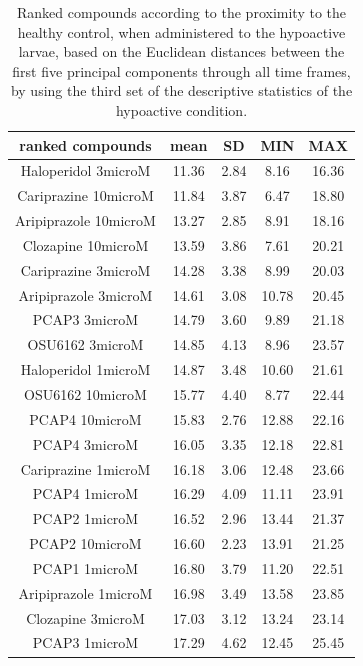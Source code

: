 \documentclass[a4paper,12pt]{article}
\begin{document}
\begin{table}[h!]\tiny
\centering
\caption{Ranked compounds according to the proximity to the healthy control, when administered to the hypoactive larvae, based on the Euclidean distances between the first five principal components through all time frames, by using the third set of the descriptive statistics of the hypoactive condition.}
\begin{tabular}{|c|c|c|c|c|}
\hline
ranked compounds             & mean & SD   & MIN  & MAX   \\ \hline
Haloperidol 3microM   & 11.36 & 2.84  & 8.16  & 16.36 \\ \hline
Cariprazine 10microM  & 11.84 & 3.87  & 6.47  & 18.80  \\ \hline
Aripiprazole 10microM & 13.27 & 2.85  & 8.91  & 18.16 \\ \hline
Clozapine 10microM    & 13.59 & 3.86  & 7.61  & 20.21 \\ \hline
Cariprazine 3microM   & 14.28 & 3.38  & 8.99  & 20.03 \\ \hline
Aripiprazole 3microM  & 14.61 & 3.08  & 10.78 & 20.45 \\ \hline
PCAP3 3microM       & 14.79 & 3.60   & 9.89  & 21.18 \\ \hline
OSU6162 3microM       & 14.85 & 4.13  & 8.96  & 23.57 \\ \hline
Haloperidol 1microM   & 14.87 & 3.48  & 10.60  & 21.61 \\ \hline
OSU6162 10microM      & 15.77 & 4.40   & 8.77  & 22.44 \\ \hline
PCAP4 10microM      & 15.83 & 2.76  & 12.88 & 22.16 \\ \hline
PCAP4 3microM       & 16.05 & 3.35  & 12.18 & 22.81 \\ \hline
Cariprazine 1microM   & 16.18 & 3.06  & 12.48 & 23.66 \\ \hline
PCAP4 1microM       & 16.29 & 4.09  & 11.11 & 23.91 \\ \hline
PCAP2 1microM         & 16.52 & 2.96  & 13.44 & 21.37 \\ \hline
PCAP2 10microM        & 16.60  & 2.23  & 13.91 & 21.25 \\ \hline
PCAP1 1microM         & 16.80  & 3.79  & 11.20  & 22.51 \\ \hline
Aripiprazole 1microM  & 16.98 & 3.49  & 13.58 & 23.85 \\ \hline
Clozapine 3microM     & 17.03 & 3.12  & 13.24 & 23.14 \\ \hline
PCAP3 1microM       & 17.29 & 4.62  & 12.45 & 25.45 \\ \hline

\end{tabular}
\end{table}
\end{document}
